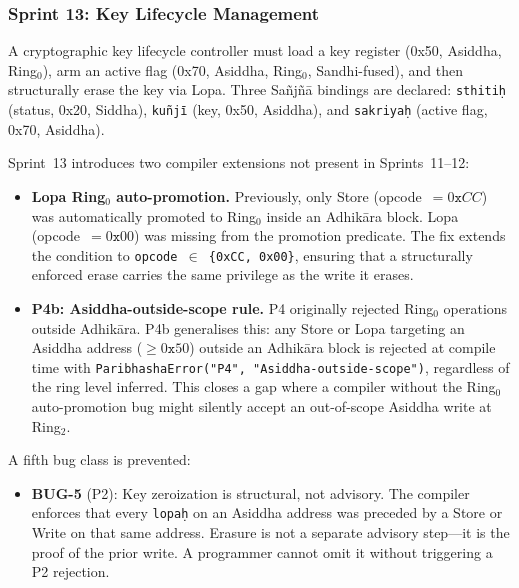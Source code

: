 \documentclass[11pt,a4paper]{article}
\begin{document}
\subsubsection{Sprint 13: Key Lifecycle Management}

A cryptographic key lifecycle controller must load a key register (0x50,
Asiddha, Ring$_0$), arm an active flag (0x70, Asiddha, Ring$_0$,
Sandhi-fused), and then structurally erase the key via Lopa. Three
Sa\~{n}j\~{n}\={a} bindings are declared: \texttt{sthiti\d{h}} (status,
0x20, Siddha), \texttt{ku\~{n}j\={\i}} (key, 0x50, Asiddha), and
\texttt{sakriya\d{h}} (active flag, 0x70, Asiddha).

Sprint~13 introduces two compiler extensions not present in Sprints~11--12:

\begin{itemize}
\item \textbf{Lopa Ring$_0$ auto-promotion.} Previously, only Store
  (opcode~$= 0\texttt{x}CC$) was automatically promoted to Ring$_0$ inside
  an Adhi\-k\={a}ra block. Lopa (opcode~$= 0\texttt{x}00$) was missing from
  the promotion predicate. The fix extends the condition to
  \texttt{opcode~$\in$~\{0xCC, 0x00\}}, ensuring that a structurally enforced
  erase carries the same privilege as the write it erases.

\item \textbf{P4b: Asiddha-outside-scope rule.} P4 originally rejected
  Ring$_0$ operations outside Adhi\-k\={a}ra. P4b generalises this: any
  Store or Lopa targeting an Asiddha address ($\geq 0\texttt{x}50$) outside
  an Adhi\-k\={a}ra block is rejected at compile time with
  \texttt{ParibhashaError("P4", "Asiddha-outside-scope")}, regardless of the
  ring level inferred. This closes a gap where a compiler without the
  Ring$_0$ auto-promotion bug might silently accept an out-of-scope Asiddha
  write at Ring$_2$.
\end{itemize}

A fifth bug class is prevented:

\begin{itemize}
\item \textbf{BUG-5} (P2): Key zeroization is structural, not advisory.
  The compiler enforces that every \texttt{lopa\d{h}} on an Asiddha address
  was preceded by a Store or Write on that same address. Erasure is not a
  separate advisory step---it is the proof of the prior write. A programmer
  cannot omit it without triggering a P2 rejection.
\end{itemize}
\end{document}
